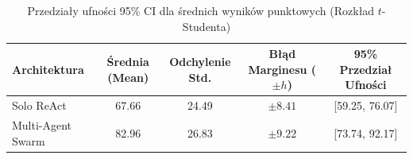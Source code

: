 \begin{table}[htbp]
\centering
\caption{Przedziały ufności 95\% CI dla średnich wyników punktowych (Rozkład $t$-Studenta)}
\label{tab:przedzialy_ufnosci}
\begin{tabular}{lcccc}
\hline
\textbf{Architektura} & \textbf{Średnia (Mean)} & \textbf{Odchylenie Std.} & \textbf{Błąd Marginesu ($\pm h$)} & \textbf{95\% Przedział Ufności} \\
\hline
Solo ReAct & 67.66 & 24.49 & $\pm 8.41$ & [59.25, 76.07] \\
Multi-Agent Swarm & 82.96 & 26.83 & $\pm 9.22$ & [73.74, 92.17] \\
\hline
\end{tabular}
\end{table}
